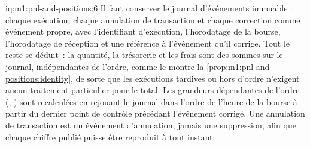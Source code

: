\begin{solution}{iq:m1:pnl-and-positions:6}
Il faut conserver le journal d'événements immuable~: chaque exécution, chaque annulation de transaction et chaque correction comme
événement propre, avec l'identifiant d'exécution, l'horodatage de la bourse, l'horodatage de réception
et une référence à l'événement qu'il corrige. Tout le reste se déduit~: la quantité,
la trésorerie et les frais sont des sommes sur le journal, indépendantes de l'ordre, comme
le montre la \cref{prop:m1:pnl-and-positions:identity}, de sorte que les exécutions tardives ou hors d'ordre
n'exigent aucun traitement particulier pour le total. Les grandeurs dépendantes de l'ordre (,
) sont recalculées en rejouant le journal dans l'ordre de l'heure de la bourse
à partir du dernier point de contrôle précédant l'événement corrigé. Une annulation de transaction est un
événement d'annulation, jamais une suppression, afin que chaque chiffre publié puisse être reproduit
à tout instant.
\end{solution}
